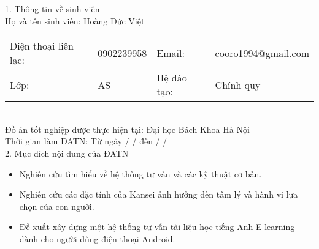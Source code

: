  
 
\begin{acknowledgementslong}      
1. Thông tin về sinh viên\\
Họ và tên sinh viên: Hoàng Đức Việt\\
\begin{tabular}{@{}l l l l}
Điện thoại liên lạc: & 0902239958 & Email: & cooro1994@gmail.com \\ 
Lớp: &AS & Hệ đào tạo:  & Chính quy
\end{tabular}\\
Đồ án tốt nghiệp được thực hiện tại: Đại học Bách Khoa Hà Nội\\
Thời gian làm ĐATN: Từ ngày  /  /    đến   /  /    \\[0.5cm]
2. Mục đích nội dung của ĐATN \\
\begin{itemize}
\item Nghiên cứu tìm hiểu về hệ thống tư vấn và các kỹ thuật cơ bản.  
\item Nghiên cứu các đặc tính của Kansei ảnh hưởng đến tâm lý và hành vi lựa chọn của con người.
\item Đề xuất xây dựng một hệ thống tư vấn tài liệu học tiếng Anh E-learning dành cho người dùng điện thoại Android.
\end{itemize}


\end{acknowledgementslong}
